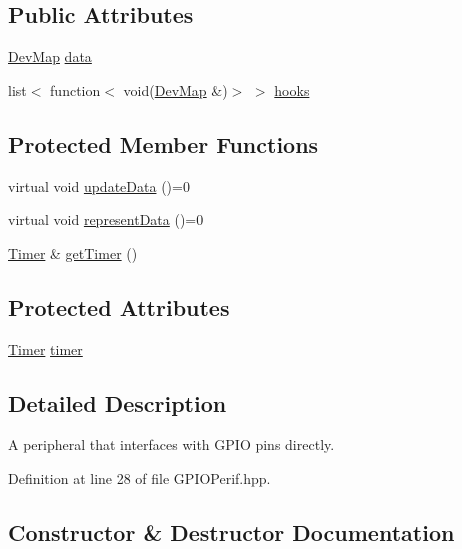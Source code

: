 \subsection*{Public Attributes}
\begin{DoxyCompactItemize}
\item 
\mbox{\hyperlink{Perif_8hpp_a358ff4ee6d24694ee7661f0cce14377e}{Dev\+Map}} \mbox{\hyperlink{classperif_1_1PerifBase_a1a3afaa535fda17e9f97123fffe78765}{data}}
\item 
list$<$ function$<$ void(\mbox{\hyperlink{Perif_8hpp_a358ff4ee6d24694ee7661f0cce14377e}{Dev\+Map}} \&)$>$ $>$ \mbox{\hyperlink{classperif_1_1PerifBase_a98964e5ca8384df64881265e0aa6d7b6}{hooks}}
\end{DoxyCompactItemize}
\subsection*{Protected Member Functions}
\begin{DoxyCompactItemize}
\item 
virtual void \mbox{\hyperlink{classperif_1_1Perif_a7c9b9c1af5300dc5c007f9559fefbffe}{update\+Data}} ()=0
\item 
virtual void \mbox{\hyperlink{classperif_1_1Perif_a556c780e9e4623aa6b7c3d167ef23e6b}{represent\+Data}} ()=0
\item 
\mbox{\hyperlink{classTimer}{Timer}} \& \mbox{\hyperlink{classperif_1_1Perif_a29c48598a861d85256c30e28af67f864}{get\+Timer}} ()
\end{DoxyCompactItemize}
\subsection*{Protected Attributes}
\begin{DoxyCompactItemize}
\item 
\mbox{\hyperlink{classTimer}{Timer}} \mbox{\hyperlink{classperif_1_1Perif_acfa1256201bead82ccce1a0a8bcc24e1}{timer}}
\end{DoxyCompactItemize}


\subsection{Detailed Description}
A peripheral that interfaces with G\+P\+IO pins directly. 

Definition at line 28 of file G\+P\+I\+O\+Perif.\+hpp.



\subsection{Constructor \& Destructor Documentation}
\mbox{\label{classperif_1_1GPIOPerif_a8a96ad56b51e9c46115bb8320e1c268d}} 
